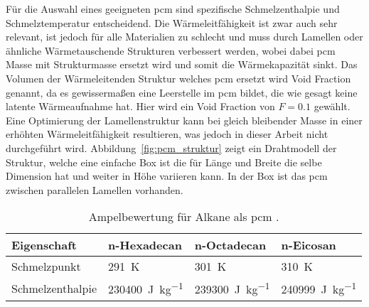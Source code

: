 Für die Auswahl eines geeigneten \ac{pcm} sind spezifische Schmelzenthalpie und Schmelztemperatur entscheidend.
Die Wärmeleitfähigkeit ist zwar auch sehr relevant, ist jedoch für alle Materialien zu schlecht und muss durch Lamellen oder ähnliche Wärmetauschende Strukturen verbessert werden,
wobei dabei \ac{pcm} Masse mit Strukturmasse ersetzt wird und somit die Wärmekapazität sinkt. Das Volumen der Wärmeleitenden Struktur welches
\ac{pcm} ersetzt wird Void Fraction genannt, da es gewissermaßen eine Leerstelle im \ac{pcm} bildet, die wie gesagt keine latente Wärmeaufnahme hat. Hier
wird ein Void Fraction von $F = 0.1$ gewählt. Eine Optimierung der Lamellenstruktur kann bei gleich bleibender Masse in einer erhöhten
Wärmeleitfähigkeit resultieren, was jedoch in dieser Arbeit nicht durchgeführt wird. Abbildung~\ref{fig:pcm_struktur} zeigt ein Drahtmodell der Struktur,
welche eine einfache Box ist die für Länge und Breite die selbe Dimension hat und weiter in Höhe variieren kann. In der Box ist
das \ac{pcm} zwischen parallelen Lamellen vorhanden.

\begin{table}
  \centering
  \caption{Ampelbewertung für Alkane als \ac{pcm} \cite{NIST}.}\label{tab:pcm_auswahl}
  \label{tab:pcm_alkane_nist}
  \begin{tabular}{>{\raggedright\arraybackslash}m{3.1cm} m{3.1cm} m{3.1cm} m{3.1cm}}
    \toprule[1pt]
    Eigenschaft & n-Hexadecan & n-Octadecan & n-Eicosan \\
    \midrule[0.5pt]

    Schmelzpunkt
      & \cellcolor{bad}\SI{291}{\kelvin}
      & \cellcolor{medium}\SI{301}{\kelvin}
      & \cellcolor{good}\SI{310}{\kelvin} \\

    Schmelzenthalpie
      & \cellcolor{bad}\SI{230400}{\joule\per\kilo\gram}
      & \cellcolor{medium}\SI{239300}{\joule\per\kilo\gram}
      & \cellcolor{good}\SI{240999}{\joule\per\kilo\gram} \\
    \bottomrule[1pt]
  \end{tabular}
\end{table}

